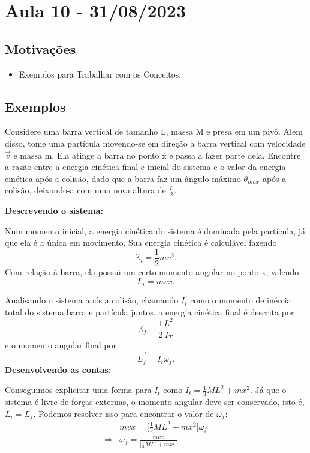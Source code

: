 \documentclass[physicsII_notes.tex]{subfiles}
\begin{document}
\section{Aula 10 - 31/08/2023}
\subsection{Motivações}
\begin{itemize}
	\item Exemplos para Trabalhar com os Conceitos.
\end{itemize}
\subsection{Exemplos}
\begin{example}
	Considere uma barra vertical de tamanho L, massa M e presa em um pivô. Além disso, tome uma partícula movendo-se em direção à barra vertical com velocidade \(\vec{v}\) e massa m.
	Ela atinge a barra no ponto x e passa a fazer parte dela. Encontre a razão entre a energia cinética final e inicial do sistema e o valor da energia cinética após a colisão, dado
	que a barra faz um ângulo máximo \(\theta_{max}\) após a colisão, deixando-a com uma nova altura de \(\frac{L}{2}\).

	\textbf{Descrevendo o sistema:}

	Num momento inicial, a energia cinética do sistema é dominada pela partícula, já que ela é a única em movimento. Sua energia cinética é calculável fazendo
	\[
		\mathbb{K}_{i} = \frac{1}{2}mv^{2}.
	\]
	Com relação à barra, ela possui um certo momento angular no ponto x, valendo
	\[
		L_{i} = mvx.
	\]

	Analisando o sistema após a colisão, chamando \(I_{t}\) como o momento de inércia total do sistema barra e partícula juntos, a energia cinética final
	é descrita por
	\[
		\mathbb{K}_{f} = \frac{1}{2}\frac{L^{2}}{I_{T}}
	\]
	e o momento angular final por
	\[
		\vec{L_{f}} = I_{t}\omega_{f}.
	\]
	\textbf{Desenvolvendo as contas:}

	Conseguimos explicitar uma forma para \(I_{t}\) como \(I_{t} = \frac{1}{3}ML^{2} + mx^{2}\). Já que o sistema é livre de forças externas, o momento angular deve ser conservado, isto é,
	\(L_{i} = L_{f}\). Podemos resolver isso para encontrar o valor de \(\omega_{f}:\)
	\begin{align*}
		            & mvx = \biggl[\frac{1}{3}ML^{2} + mx^{2}\biggr]\omega_{f}        \\
		\Rightarrow & \omega_{f} = \frac{mvx}{\biggl[\frac{1}{3}ML^{2}+mx^{2}\biggr]}
	\end{align*}


\end{example}
\end{document}

